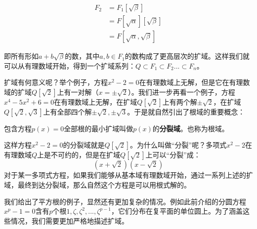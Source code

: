\documentclass[b5paper]{ctexart}
\begin{document}
\[
\begin{array}{rl}
F_2 & = F_1[\sqrt{\beta}] \\
    & = F[\sqrt{\alpha}][\sqrt{\beta}] \\
    & = F[\sqrt{\alpha}, \sqrt{\beta}]
\end{array}
\]

即所有形如$a + b \sqrt{\beta}$的数，其中$a, b \in F_1$的数构成了更高层次的扩域。这样我们就可以从有理数域开始，得到一个扩域系列：$Q \subset F_1 \subset F_2 ... \subset F_n$。

扩域有何意义呢？举个例子，方程$x^2 - 2 = 0$在有理数域上无解，但是它在有理数域的扩域$Q[\sqrt{2}]$上有一对解（$x = \pm \sqrt{2}$）。我们进一步再看一个例子，方程$x^4 - 5x^2 + 6 = 0$在有理数域上无解，在扩域$Q[\sqrt{2}]$上有两个解$\pm \sqrt{2}$，在扩域$Q[\sqrt{2}, \sqrt{3}]$上有全部四个解$\pm \sqrt{2}, \pm \sqrt{3}$。于是就自然引出了根域的重要概念：

 
\begin{definition}
包含方程$p(x) = 0$全部根的最小扩域叫做$p(x)$的\textbf{分裂域}。也称为根域。
\end{definition}

这样方程$x^2 -2 = 0$的分裂域就是$Q[\sqrt{2}]$。为什么叫做“分裂”呢？多项式$x^2-2$在有理数域$Q$上是不可约的，但是在扩域$Q[\sqrt{2}]$上可以“分裂”成：
\[
(x + \sqrt{2}) (x - \sqrt{2})
\]
对于某一多项式方程，如果我们能够从基本域有理数域开始，通过一系列上述的扩域，最终到达分裂域，那么自然这个方程是可以用根式解的。

我们给出了平方根的例子，显然还有更加复杂的情况。例如此前介绍的分圆方程$x^p-1=0$含有$p$个根$1, \zeta, \zeta^2, ..., \zeta^{p-1}$，它们分布在复平面的单位圆上。为了涵盖这些情况，我们需要更加严格地描述扩域。

\end{document}
